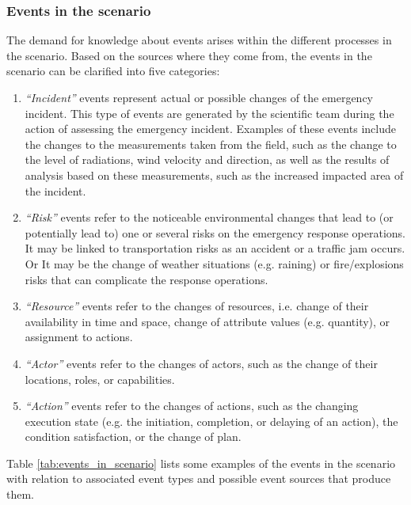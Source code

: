 \subsubsection{Events in the scenario} %
\label{ssub:events_in_the_scenario}
The demand for knowledge about events arises within the different processes in the scenario. Based on the sources where they come from, the events in the scenario can be clarified into five categories:

\begin{enumerate}
 	\item \emph{``Incident''} events represent actual or possible changes of the emergency incident. This type of events are generated by the scientific team during the action of assessing the emergency incident. Examples of these events include the changes to the measurements taken from the field, such as the change to the level of radiations, wind velocity and direction, as well as the results of analysis based on these measurements, such as the increased impacted area of the incident. 
 	\item \emph{``Risk''} events refer to the noticeable environmental changes that lead to (or potentially lead to) one or several risks on the emergency response operations. It may be linked to transportation risks as an accident or a traffic jam occurs. Or It may be the change of weather situations (e.g. raining) or fire/explosions risks that can complicate the response operations. 
 	\item \emph{``Resource''} events refer to the changes of resources, i.e. change of their availability in time and space, change of attribute values (e.g. quantity), or assignment to actions.
 	\item \emph{``Actor''} events refer to the changes of actors, such as the change of their locations, roles, or capabilities.
 	\item \emph{``Action''} events refer to the changes of actions, such as the changing execution state (e.g. the initiation, completion, or delaying of an action), the condition satisfaction, or the change of plan. 
 \end{enumerate} 

Table \ref{tab:events_in_scenario} lists some examples of the events in the scenario with relation to associated event types and possible event sources that produce them.

